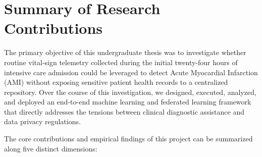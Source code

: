 \documentclass[12pt,a4paper,oneside]{report}
\begin{document}
\section{Summary of Research Contributions}
\label{sec:summary_contributions}

The primary objective of this undergraduate thesis was to investigate whether routine vital-sign telemetry collected during the initial twenty-four hours of intensive care admission could be leveraged to detect Acute Myocardial Infarction (AMI) without exposing sensitive patient health records to a centralized repository. Over the course of this investigation, we designed, executed, analyzed, and deployed an end-to-end machine learning and federated learning framework that directly addresses the tensions between clinical diagnostic assistance and data privacy regulations.

The core contributions and empirical findings of this project can be summarized along five distinct dimensions:
\end{document}
